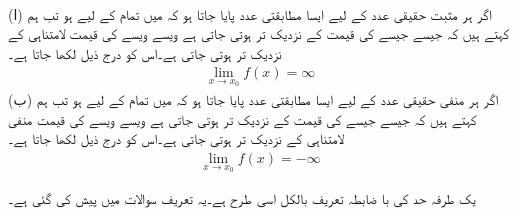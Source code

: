 \\
(ا)\quad
اگر ہر مثبت حقیقی عدد  کے لیے ایسا مطابقتی عدد  پایا جاتا ہو کہ   میں تمام  کے لیے  ہو تب ہم کہتے ہیں کہ جیسے جیسے  کی قیمت  کے نزدیک تر ہوتی جاتی ہے ویسے ویسے  کی قیمت لامتناہی کے نزدیک تر ہوتی جاتی ہے۔اس کو درج ذیل لکھا جاتا ہے۔
\begin{align*}
\lim_{x\to x_0} f(x)=\infty
\end{align*}   
(ب)\quad
اگر ہر منفی حقیقی عدد  کے لیے ایسا مطابقتی عدد  پایا جاتا ہو کہ   میں تمام  کے لیے  ہو تب ہم کہتے ہیں کہ جیسے جیسے  کی قیمت  کے نزدیک تر ہوتی جاتی ہے ویسے ویسے  کی قیمت منفی لامتناہی کے نزدیک تر ہوتی جاتی ہے۔اس کو درج ذیل لکھا جاتا ہے۔
\begin{align*}
\lim_{x\to x_0} f(x)=-\infty
\end{align*}  

یک طرفہ حد کی با ضابطہ تعریف بالکل اسی طرح ہے۔یہ  تعریف  سوالات میں پیش کی گئی  ہے۔

